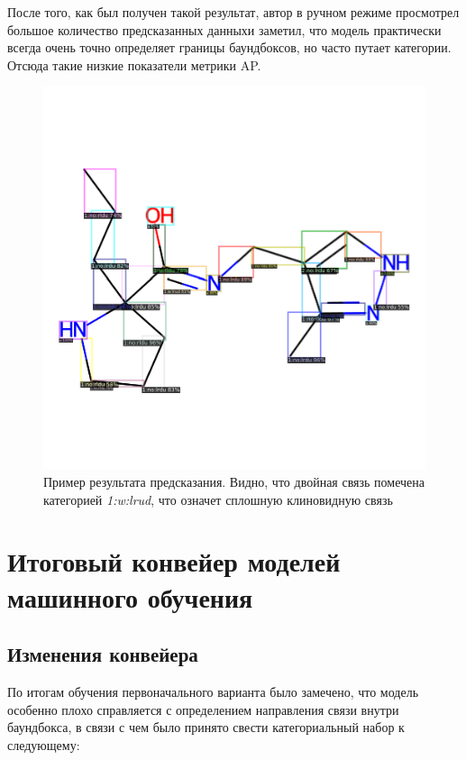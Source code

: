 После того, как был получен такой результат, автор в ручном режиме просмотрел большое количество предсказанных данныхи заметил, что модель практически всегда очень точно определяет границы баундбоксов, но часто путает категории. Отсюда такие низкие показатели метрики AP.

\begin{figure}[ht!] 
	\center
	\includegraphics [scale=0.25] {my_folder/images/incorrect_faster_rcnn}
	\caption{Пример результата предсказания. Видно, что двойная связь помечена категорией \textit{1:w:lrud}, что означет сплошную клиновидную связь} 
	\label{fig:rcnn_false}
\end{figure}


\section{Итоговый конвейер моделей машинного обучения} \label{ch2:sec3}
\subsection{Изменения конвейера}
По итогам обучения первоначального варианта было замечено, что модель особенно плохо справляется с определением направления связи внутри баундбокса, в связи с чем было принято свести категориальный набор к следующему:

